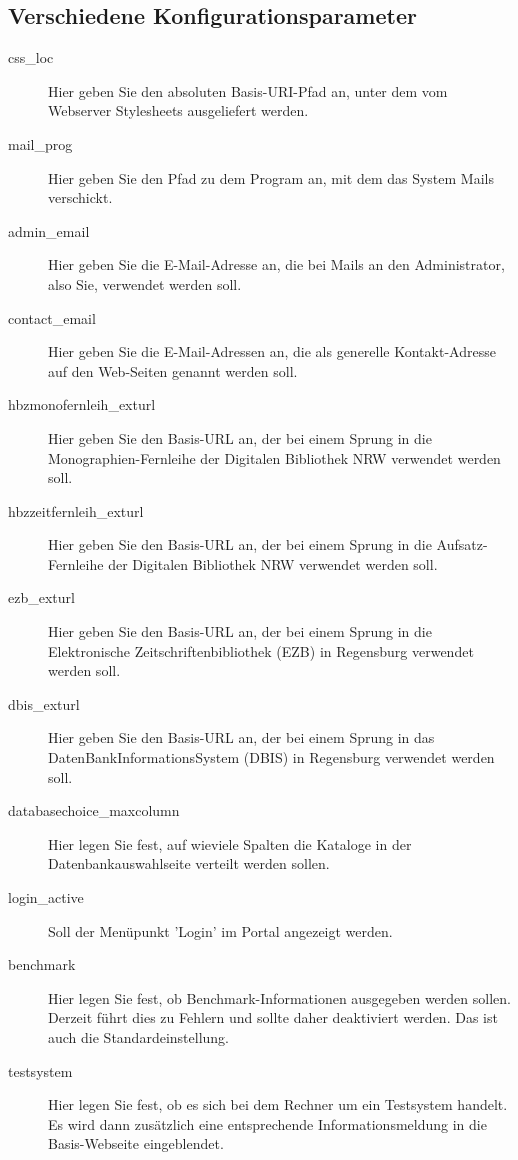 \documentclass[11pt, twoside, a4paper, BCOR8mm, DIV12, bibtotoc,idxtotoc]{scrbook}
\begin{document}
\subsection{Verschiedene Konfigurationsparameter}

\begin{description}
\item[css\_loc] Hier geben Sie den absoluten Basis-URI-Pfad an, unter
  dem vom Webserver Stylesheets ausgeliefert werden.
\item[mail\_prog] Hier geben Sie den Pfad zu dem Program an, mit dem
  das System Mails verschickt.
\item[admin\_email] Hier geben Sie die E-Mail-Adresse an, die bei Mails
  an den Administrator, also Sie, verwendet werden soll.
\item[contact\_email] Hier geben Sie die E-Mail-Adressen an, die als
  generelle Kontakt-Adresse auf den Web-Seiten genannt werden soll.
\item[hbzmonofernleih\_exturl] Hier geben Sie den Basis-URL an, der bei
  einem Sprung in die Mono\-graphien-Fernleihe der Digitalen Bibliothek
  NRW verwendet werden soll.
\item[hbzzeitfernleih\_exturl] Hier geben Sie den Basis-URL an, der bei
  einem Sprung in die Aufsatz-Fernleihe der Digitalen Bibliothek
  NRW verwendet werden soll.
\item[ezb\_exturl] Hier geben Sie den Basis-URL an, der bei
  einem Sprung in die Elektronische Zeitschriftenbibliothek (EZB) in
  Regensburg verwendet werden soll.
\item[dbis\_exturl] Hier geben Sie den Basis-URL an, der bei einem
  Sprung in das DatenBankInformationsSystem (DBIS)  in Regensburg
  verwendet werden soll. 
\item[databasechoice\_maxcolumn] Hier legen Sie fest, auf wieviele
  Spalten die Kataloge in der Datenbankauswahlseite verteilt werden
  sollen. 
\item[login\_active] Soll der Menüpunkt 'Login' im Portal angezeigt
  werden.
\item[benchmark] Hier legen Sie fest, ob Benchmark-Informationen
  ausgegeben werden sollen. Derzeit führt dies zu Fehlern und sollte
  daher deaktiviert werden. Das ist auch die Standardeinstellung.
\item[testsystem] Hier legen Sie fest, ob es sich bei dem Rechner um
  ein Testsystem handelt. Es wird dann zusätzlich eine entsprechende
  Informationsmeldung in die Basis-Webseite eingeblendet.
\end{description}
\end{document}
